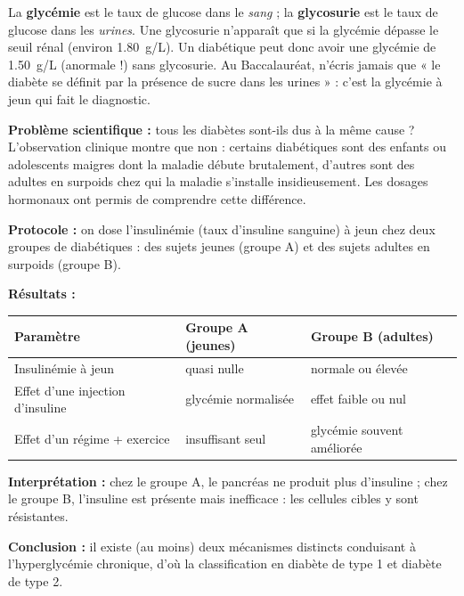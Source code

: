 \documentclass[11pt]{article}
\newcounter{popsec}
\newcounter{popsub}
\newcommand{\courssub}[1]{%
  \stepcounter{popsub}%
  \par\vspace{9pt}\noindent{\popxbold\fontsize{11.5}{13}\selectfont\color{popink}{\color{poporange}\thepopsec.\thepopsub}\hspace{6pt}#1}\par\nopagebreak\vspace{4pt}
}
\begin{document}
\begin{attention}
La \textbf{glycémie} est le taux de glucose dans le \emph{sang} ; la \textbf{glycosurie} est le taux de glucose dans les \emph{urines}. Une glycosurie n'apparaît que si la glycémie dépasse le seuil rénal (environ \SI{1,80}{g/L}). Un diabétique peut donc avoir une glycémie de \SI{1,50}{g/L} (anormale !) sans glycosurie. Au Baccalauréat, n'écris jamais que « le diabète se définit par la présence de sucre dans les urines » : c'est la glycémie à jeun qui fait le diagnostic.
\end{attention}

\courssub{Les deux grands types de diabète}

\textbf{Problème scientifique :} tous les diabètes sont-ils dus à la même cause ? L'observation clinique montre que non : certains diabétiques sont des enfants ou adolescents maigres dont la maladie débute brutalement, d'autres sont des adultes en surpoids chez qui la maladie s'installe insidieusement. Les dosages hormonaux ont permis de comprendre cette différence.

\begin{experience}
\textbf{Protocole :} on dose l'insulinémie (taux d'insuline sanguine) à jeun chez deux groupes de diabétiques : des sujets jeunes (groupe A) et des sujets adultes en surpoids (groupe B).

\textbf{Résultats :}
\begin{center}
\begin{tabularx}{\linewidth}{|l|X|X|}
\hline
\rowcolor{popblueL} \textbf{Paramètre} & \textbf{Groupe A (jeunes)} & \textbf{Groupe B (adultes)} \\
\hline
Insulinémie à jeun & quasi nulle & normale ou élevée \\
\hline
Effet d'une injection d'insuline & glycémie normalisée & effet faible ou nul \\
\hline
Effet d'un régime + exercice & insuffisant seul & glycémie souvent améliorée \\
\hline
\end{tabularx}
\end{center}

\textbf{Interprétation :} chez le groupe A, le pancréas ne produit plus d'insuline ; chez le groupe B, l'insuline est présente mais inefficace : les cellules cibles y sont résistantes.

\textbf{Conclusion :} il existe (au moins) deux mécanismes distincts conduisant à l'hyperglycémie chronique, d'où la classification en diabète de type 1 et diabète de type 2.
\end{experience}
\end{document}
